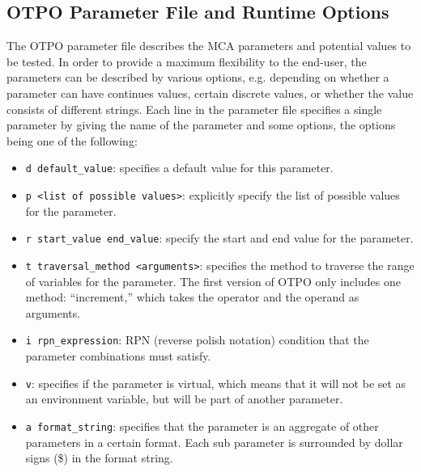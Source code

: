 


\subsection{OTPO Parameter File and Runtime Options}

The OTPO parameter file describes the MCA parameters and potential values to be tested. In order to provide a maximum flexibility to the end-user, the parameters can be described by various options, e.g. depending on whether a parameter can have continues values, certain discrete values, or whether the value consists of different strings. Each line in the parameter file specifies a single parameter by giving the name of the parameter and some options, the options being one of the following:
\begin{itemize}
\item {\tt d default\_\-value}: specifies a default value for this parameter.
\item {\tt p <list of possible values>}: explicitly specify the list of possible
  values for the parameter.
\item {\tt r start\_\-value end\_\-value}: specify the start and end value for the
  parameter.
\item {\tt t traversal\_\-method <arguments>}: specifies the method to traverse the range of
  variables for the parameter. The first version of OTPO only includes
  one method: ``increment,''
  which takes the operator and the operand as arguments.
\item {\tt i rpn\_\-expression}: RPN (reverse polish notation) condition that the parameter
  combinations must satisfy.
\item {\tt v}: specifies if the parameter is virtual, which means that it will not be
  set as an environment variable, but will be part of another parameter.
\item {\tt a format\_\-string}: specifies that the parameter is an aggregate of
  other parameters in a certain format. Each sub parameter is surrounded by
  dollar signs (\$) in the format string.
\end{itemize}

